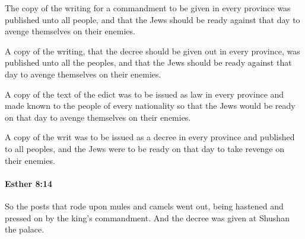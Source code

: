 			The copy of the writing for a commandment to be given in every province was published unto all people, and that the Jews should be ready against that day to avenge themselves on their enemies.

			\begin{versebox}
					\item[BHS] 
					\item[LXX] 
					\item[ASV] A copy of the writing, that the decree should be given out in every province, was published unto all the peoples, and that the Jews should be ready against that day to avenge themselves on their enemies.
					\item[NIV] A copy of the text of the edict was to be issued as law in every province and made known to the people of every nationality so that the Jews would be ready on that day to avenge themselves on their enemies.
					\item[NRSV] A copy of the writ was to be issued as a decree in every province and published to all peoples, and the Jews were to be ready on that day to take revenge on their enemies.
			\end{versebox}

		\paragraph{Esther 8:14} %
			\label{ESTHER-8-14}

			So the posts that rode upon mules and camels went out, being hastened and pressed on by the king’s commandment. And the decree was given at Shushan the palace.

